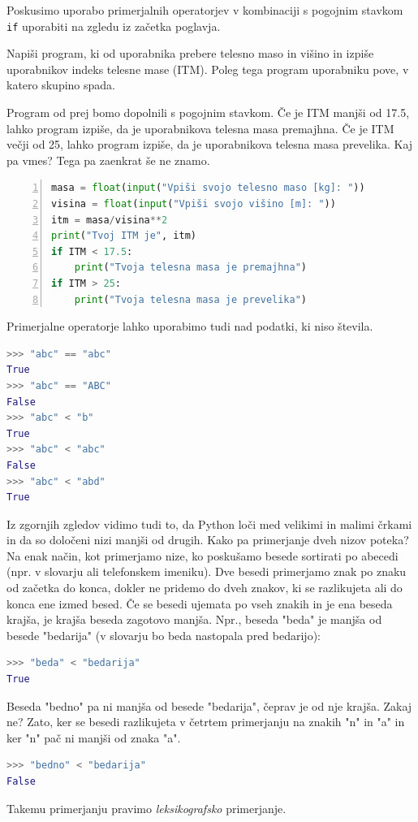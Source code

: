 Poskusimo uporabo primerjalnih operatorjev v kombinaciji s pogojnim stavkom \texttt{if} uporabiti na zgledu iz začetka poglavja.
\begin{zgled}
Napiši program, ki od uporabnika prebere telesno maso in višino in izpiše uporabnikov indeks telesne mase (ITM). Poleg tega program uporabniku pove, v katero skupino spada. 
\end{zgled}
\begin{resitev}
Program od prej bomo dopolnili s pogojnim stavkom. Če je ITM manjši od 17.5, lahko program izpiše, da je uporabnikova telesna masa premajhna. Če je ITM večji od 25, lahko program izpiše, da je uporabnikova telesna masa prevelika. Kaj pa vmes? Tega pa zaenkrat še ne znamo. 
\begin{lstlisting}[language=Python,numbers=left]
masa = float(input("Vpiši svojo telesno maso [kg]: "))
visina = float(input("Vpiši svojo višino [m]: "))
itm = masa/visina**2
print("Tvoj ITM je", itm)
if ITM < 17.5:
    print("Tvoja telesna masa je premajhna")
if ITM > 25:
    print("Tvoja telesna masa je prevelika")
\end{lstlisting}
\end{resitev}

Primerjalne operatorje lahko uporabimo tudi nad podatki, ki niso števila.
\begin{lstlisting}[language=Python]
>>> "abc" == "abc"
True
>>> "abc" == "ABC"
False
>>> "abc" < "b"
True
>>> "abc" < "abc"
False
>>> "abc" < "abd"
True
\end{lstlisting}
Iz zgornjih zgledov vidimo tudi to, da Python loči med velikimi in malimi črkami in da so določeni nizi manjši od drugih. Kako pa primerjanje dveh nizov poteka? Na enak način, kot primerjamo nize, ko poskušamo besede sortirati po abecedi (npr. v slovarju ali telefonskem imeniku). Dve besedi primerjamo znak po znaku od začetka do konca, dokler ne pridemo do dveh znakov, ki se razlikujeta ali do konca ene izmed besed. Če se besedi ujemata po vseh znakih in je ena beseda krajša, je krajša beseda zagotovo manjša. Npr., beseda "beda" je manjša od besede "bedarija" (v slovarju bo beda nastopala pred bedarijo):
\begin{lstlisting}[language=Python]
>>> "beda" < "bedarija"
True
\end{lstlisting}
Beseda "bedno" pa ni manjša od besede "bedarija", čeprav je od nje krajša. Zakaj ne? Zato, ker se besedi razlikujeta v četrtem primerjanju na znakih "n" in "a" in ker "n" pač ni manjši od znaka "a".
\begin{lstlisting}[language=Python]
>>> "bedno" < "bedarija"
False
\end{lstlisting}
Takemu primerjanju pravimo \emph{leksikografsko} primerjanje. 

